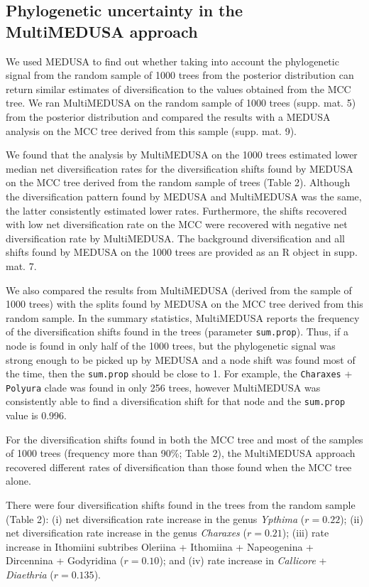\documentclass[10pt]{article}
\begin{document}
\subsection*{Phylogenetic uncertainty in the MultiMEDUSA
approach}

We used MEDUSA to find out whether taking into account the phylogenetic
signal from the random sample of 1000 trees from the posterior
distribution can return similar estimates of diversification to the
values obtained from the MCC tree. We ran MultiMEDUSA on the random
sample of 1000 trees (supp. mat. 5) from the posterior distribution and
compared the results with a MEDUSA analysis on the MCC tree derived from
this sample (supp. mat. 9).

We found that the analysis by MultiMEDUSA on the 1000 trees estimated
lower median net diversification rates for the diversification shifts
found by MEDUSA on the MCC tree derived from the random sample of trees
(Table 2). Although the
diversification pattern found by MEDUSA and MultiMEDUSA was the same,
the latter consistently estimated lower rates. Furthermore, the shifts
recovered with low net diversification rate on the MCC were recovered
with negative net diversification rate by MultiMEDUSA. The background
diversification and all shifts found by MEDUSA on the 1000 trees are
provided as an R object in supp. mat. 7.

We also compared the results from MultiMEDUSA (derived from the sample
of 1000 trees) with the splits found by MEDUSA on the MCC tree derived
from this random sample. In the summary statistics, MultiMEDUSA reports
the frequency of the diversification shifts found in the trees
(parameter \texttt{sum.prop}). Thus, if a node is found in only half of
the 1000 trees, but the phylogenetic signal was strong enough to be
picked up by MEDUSA and a node shift was found most of the time, then
the \texttt{sum.prop} should be close to 1. For example, the
\texttt{Charaxes} + \texttt{Polyura} clade was found in only 256 trees,
however MultiMEDUSA was consistently able to find a diversification
shift for that node and the \texttt{sum.prop} value is 0.996.

For the diversification shifts found in both the MCC tree and most of
the samples of 1000 trees (frequency more than 90\%; Table 2), the
MultiMEDUSA approach recovered different rates of diversification than
those found when the MCC tree alone.

There were four diversification shifts found in the trees from the
random sample (Table 2): (i) net
diversification rate increase in the genus \emph{Ypthima} ($r = 0.22$);
(ii) net diversification rate increase in the genus \emph{Charaxes}
($r = 0.21$); (iii) rate increase in Ithomiini subtribes Oleriina +
Ithomiina + Napeogenina + Dircennina + Godyridina ($r = 0.10$);
and (iv) rate increase in \emph{Callicore} + \emph{Diaethria} ($r = 0.135$).
\end{document}
